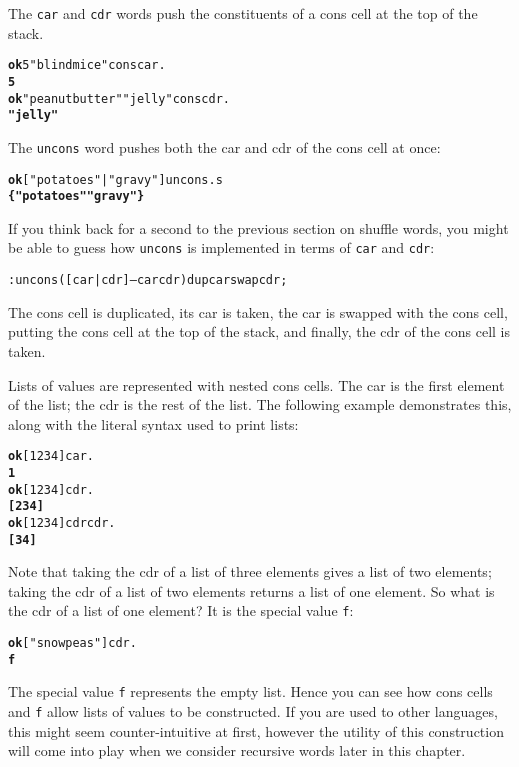 \documentclass[english]{book}
\begin{document}
The \texttt{car} and \texttt{cdr} words push the constituents of a cons cell at the top of the stack.

\begin{alltt}
\textbf{ok} 5 "blind mice" cons car .
\textbf{5}
\textbf{ok} "peanut butter" "jelly" cons cdr .
\textbf{"jelly"}
\end{alltt}

The \texttt{uncons} word pushes both the car and cdr of the cons cell at once:

\begin{alltt}
\textbf{ok} {[} "potatoes" | "gravy" {]} uncons .s
\textbf{\{ "potatoes" "gravy" \}}
\end{alltt}

If you think back for a second to the previous section on shuffle words, you might be able to guess how \texttt{uncons} is implemented in terms of \texttt{car} and \texttt{cdr}:

\begin{alltt}
: uncons ( {[} car | cdr {]} -- car cdr ) dup car swap cdr ;
\end{alltt}

The cons cell is duplicated, its car is taken, the car is swapped with the cons cell, putting the cons cell at the top of the stack, and finally, the cdr of the cons cell is taken.

Lists of values are represented with nested cons cells. The car is the first element of the list; the cdr is the rest of the list. The following example demonstrates this, along with the literal syntax used to print lists:

\begin{alltt}
\textbf{ok} {[} 1 2 3 4 {]} car .
\textbf{1}
\textbf{ok} {[} 1 2 3 4 {]} cdr .
\textbf{{[} 2 3 4 {]}}
\textbf{ok} {[} 1 2 3 4 {]} cdr cdr .
\textbf{{[} 3 4 {]}}
\end{alltt}

Note that taking the cdr of a list of three elements gives a list of two elements; taking the cdr of a list of two elements returns a list of one element. So what is the cdr of a list of one element? It is the special value \texttt{f}:

\begin{alltt}
\textbf{ok} {[} "snowpeas" {]} cdr .
\textbf{f}
\end{alltt}

The special value \texttt{f} represents the empty list. Hence you can see how cons cells and \texttt{f} allow lists of values to be constructed. If you are used to other languages, this might seem counter-intuitive at first, however the utility of this construction will come into play when we consider recursive words later in this chapter.
\end{document}
